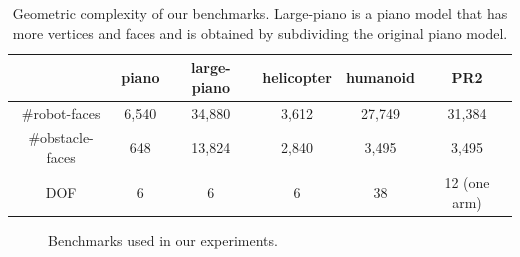 \begin{table}[htb]
\begin{center}
\begin{tabular}{|c|c|c|c|c|c|}\hline
&piano & large-piano & helicopter & humanoid & PR2 \\ \hline \hline
\#robot-faces & 6,540 & 34,880 & 3,612 &  27,749 & 31,384\\ \hline
\#obstacle-faces & 648 & 13,824 & 2,840 & 3,495 & 3,495\\ \hline
DOF & 6 & 6 & 6 & 38 & 12 (one arm) \\ \hline
\end{tabular}
\caption[Geometric complexity of benchmarks for testing GPU-based collisions]{Geometric complexity of our benchmarks. Large-piano is a piano model that has more vertices and faces and is
obtained by subdividing the original piano model.}
\label{tab:5:geom-complexity}
\end{center}
\end{table}

\begin{figure}[htb]
    \caption[Benchmarks used for testing GPU-based parallel collisions]{Benchmarks used in our experiments.}
    \label{fig:5:benchmarks}
\end{figure}

